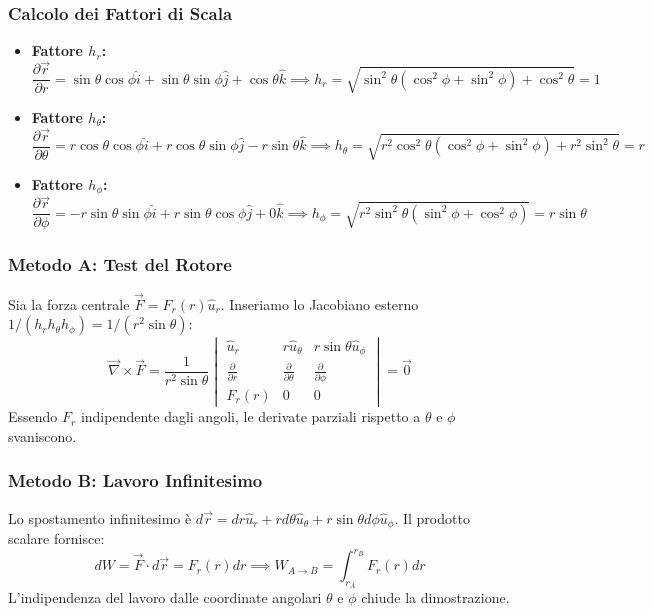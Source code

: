 \documentclass[11pt, a4paper]{article}
\begin{document}
\subsubsection*{Calcolo dei Fattori di Scala}
\begin{itemize}
    \item \textbf{Fattore $h_r$:}
    \begin{equation*}
        \frac{\partial \vec{r}}{\partial r} = \sin\theta\cos\phi\hat{i} + \sin\theta\sin\phi\hat{j} + \cos\theta\hat{k} \implies h_r = \sqrt{\sin^2\theta(\cos^2\phi+\sin^2\phi)+\cos^2\theta} = 1
    \end{equation*}
    \item \textbf{Fattore $h_\theta$:}
    \begin{equation*}
        \frac{\partial \vec{r}}{\partial \theta} = r\cos\theta\cos\phi\hat{i} + r\cos\theta\sin\phi\hat{j} - r\sin\theta\hat{k} \implies h_\theta = \sqrt{r^2\cos^2\theta(\cos^2\phi+\sin^2\phi)+r^2\sin^2\theta} = r
    \end{equation*}
    \item \textbf{Fattore $h_\phi$:}
    \begin{equation*}
        \frac{\partial \vec{r}}{\partial \phi} = -r\sin\theta\sin\phi\hat{i} + r\sin\theta\cos\phi\hat{j} + 0\hat{k} \implies h_\phi = \sqrt{r^2\sin^2\theta(\sin^2\phi+\cos^2\phi)} = r\sin\theta
    \end{equation*}
\end{itemize}

\subsubsection*{Metodo A: Test del Rotore}
Sia la forza centrale $\vec{F} = F_r(r)\hat{u}_r$. Inseriamo lo Jacobiano esterno $1/(h_r h_\theta h_\phi) = 1/(r^2\sin\theta)$:
\begin{equation*}
    \vec{\nabla} \times \vec{F} = \frac{1}{r^2 \sin\theta} 
    \begin{vmatrix} 
        \hat{u}_r & r\hat{u}_\theta & r\sin\theta\hat{u}_\phi \\ 
        \frac{\partial}{\partial r} & \frac{\partial}{\partial \theta} & \frac{\partial}{\partial \phi} \\ 
        F_r(r) & 0 & 0 
    \end{vmatrix} = \vec{0}
\end{equation*}
Essendo $F_r$ indipendente dagli angoli, le derivate parziali rispetto a $\theta$ e $\phi$ svaniscono.

\subsubsection*{Metodo B: Lavoro Infinitesimo}
Lo spostamento infinitesimo \`e $d\vec{r} = dr\hat{u}_r + rd\theta\hat{u}_\theta + r\sin\theta d\phi\hat{u}_\phi$. Il prodotto scalare fornisce:
\begin{equation*}
    dW = \vec{F} \cdot d\vec{r} = F_r(r)dr \implies W_{A \to B} = \int_{r_A}^{r_B} F_r(r)dr
\end{equation*}
L'indipendenza del lavoro dalle coordinate angolari $\theta$ e $\phi$ chiude la dimostrazione.
\end{document}
